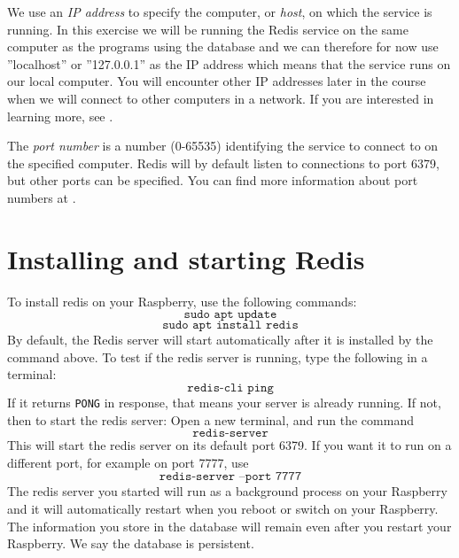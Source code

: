 \documentclass{article}
\begin{document}
We use an \emph{IP address} to specify the computer, or \emph{host}, on which the service is running. In this exercise we will be running the Redis service on the same computer as the programs using the database and we can therefore for now use ''localhost'' or ''127.0.0.1'' as the IP address which means that the service runs on our local computer. You will encounter other IP addresses later in the course when we will connect to other computers in a network. If you are interested in learning more, see \cite{ipaddress}.

The \emph{port number} is a number (0-65535) identifying the service to connect to on the specified computer. Redis will by default listen to connections to port 6379, but other ports can be specified. You can find more information about port numbers at \cite{portnumber}.

\newpage

\section{Installing  and starting Redis}
To install redis on your Raspberry, use the following commands:
\begin{equation}
    \texttt{sudo apt update}
\end{equation}
\begin{equation}
    \texttt{sudo apt install redis} 
\end{equation}
By default, the Redis server will start automatically after it is installed by the command above. 
 To test if the redis server is running, type the following in a terminal:
\begin{equation}
    \texttt{redis-cli ping}
\end{equation}
If it returns \texttt{PONG} in response, that means your server is already running. If not, then to start the redis server: Open a new terminal, and run the command
\begin{equation}
    \texttt{redis-server}
\end{equation}
This will start the redis server on its default port 6379. If you want it to run on a different port, for example on port 7777, use
\begin{equation}
    \texttt{redis-server --port 7777}
\end{equation}
The redis server you started will run as a background process on your Raspberry and it will automatically restart when you reboot or switch on your Raspberry. The information you store in the database will remain even after you restart your Raspberry. We say the database is persistent.
\end{document}
